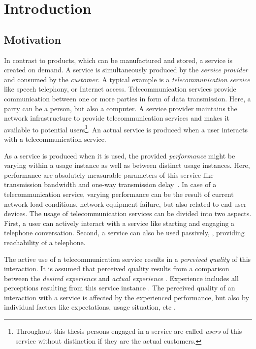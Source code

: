 \chapter{Introduction}\label{chap:01}

\section{Motivation}
In contrast to products, which can be manufactured and stored, a service is created on demand.
A service is simultaneously produced by the \emph{service provider} and consumed by the \emph{customer}.
A typical example is a \emph{telecommunication service} like speech telephony, or Internet access.
Telecommunication services provide communication between one or more parties in form of data transmission.
Here, a party can be a person, but also a computer.
A service provider maintains the network infrastructure to provide telecommunication services and makes it available to potential users\footnote{Throughout this thesis persons engaged in a service are called \emph{users} of this service without distinction if they are the actual customers.}.
An actual service is produced when a user interacts with a telecommunication service.

As a service is produced when it is used, the provided \emph{performance} might be varying within a usage instance as well as between distinct usage instances.
Here, performance are absolutely measurable parameters of this service like transmission bandwidth and one-way transmission delay~\citep[][p. 12]{moller_assessment_2000}.
In case of a telecommunication service, varying performance can be the result of current network load conditions, network equipment failure, but also related to end-user devices.
The usage of telecommunication services can be divided into two aspects.
First, a user can actively interact with a service like starting and engaging a telephone conversation.
Second, a service can also be used passively, \eg, providing reachability of a telephone.

The active use of a telecommunication service results in a \emph{perceived quality} of this interaction.
It is assumed that perceived quality results from a comparison between the \emph{desired experience} and \emph{actual experience} \citep[][p.~13]{raake_quality_2014}. %
Experience includes all perceptions resulting from this service instance \citep[][p.~13]{raake_quality_2014}.
The perceived quality of an interaction with a service is affected by the experienced performance, but also by individual factors like expectations, usage situation, etc \citep[\eg,][p.~55ff.]{reiter_factors_2014}.

